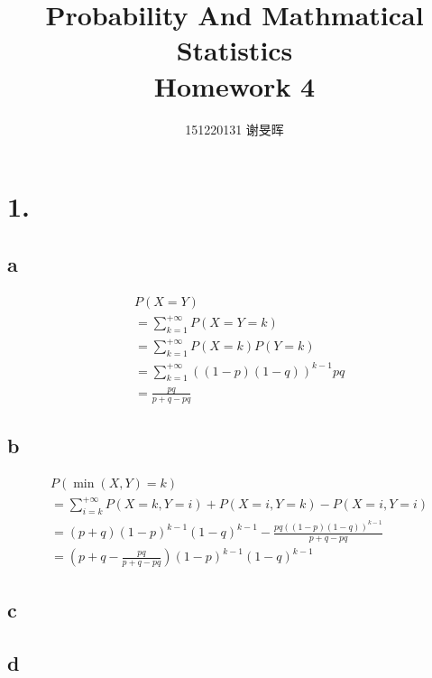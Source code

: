 \documentclass[a4paper,twocolumn]{ctexart}
\title{Probability And Mathmatical Statistics\\Homework 4}
\author{151220131 谢旻晖}
\date{}
\begin{document}
\maketitle
\section*{1.}
\subsection*{a}
\begin{align*}
&P(X=Y)\\
&=\sum_{k=1}^{+\infty}P(X=Y=k)\\
&=\sum_{k=1}^{+\infty}P(X=k)P(Y=k)\\
&=\sum_{k=1}^{+\infty}\left(\left(1-p\right)\left(1-q\right)\right)^{k-1}pq\\
&=\frac{pq}{p+q-pq}
\end{align*}
\subsection*{b}
\begin{align*}
&P(\min\left(X,Y\right)=k)\\
&=\sum_{i=k}^{+\infty}P(X=k,Y=i)+P(X=i,Y=k)-P(X=i,Y=i)\\
&=(p+q)(1-p)^{k-1}(1-q)^{k-1}-\frac{pq((1-p)(1-q))^{k-1}}{p+q-pq}\\
&=(p+q-\frac{pq}{p+q-pq})(1-p)^{k-1}(1-q)^{k-1}
\end{align*}

\subsection*{c}
\subsection*{d}
\end{document}

